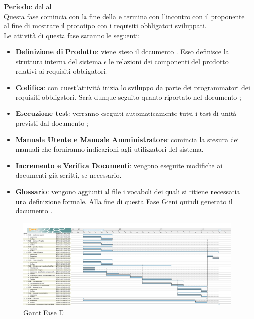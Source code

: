 	\textbf{Periodo}: dal  al  \\Questa fase comincia con la fine della  e termina con l'incontro con il proponente al fine di mostrare il prototipo con i requisiti obbligatori sviluppati.\\Le attività di questa fase saranno le seguenti:
	\begin{itemize}
		\item\textbf{Definizione di Prodotto}: viene steso il documento . Esso definisce la struttura interna del sistema e le relazioni dei componenti del prodotto relativi ai requisiti obbligatori.
		\item \textbf{Codifica}: con quest'attività inizia lo sviluppo da parte dei programmatori dei requisiti obbligatori. Sarà dunque seguito quanto riportato nel documento ;
		\item \textbf{Esecuzione test}: verranno eseguiti automaticamente tutti i test di unità previsti dal documento ;
		\item\textbf{Manuale Utente e Manuale Amministratore}: comincia la stesura dei manuali che forniranno indicazioni agli utilizzatori del sistema.
		\item\textbf{Incremento e Verifica Documenti}: vengono eseguite modifiche ai documenti già scritti, se necessario.
		\item\textbf{Glossario}: vengono aggiunti al file  i vocaboli dei quali si ritiene necessaria una definizione formale. Alla fine di questa Fase Gieni quindi generato il documento .
	\end{itemize}
	\begin{figure}[H]\centering
		\includegraphics[width=\textwidth]{PianoDiProgetto/Pics/FaseD.png}
	\caption{Gantt Fase D}
\end{figure}
